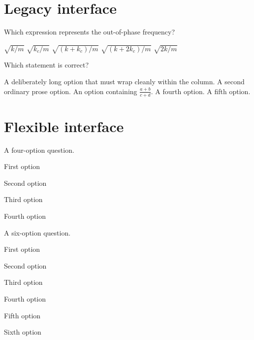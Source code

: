 \documentclass[10pt,a4paper]{physicsquiz}
\begin{document}
\section*{Legacy interface}

\begin{quizquestions}[2]
    \item Which expression represents the out-of-phase frequency?

    \choices
    {\(\sqrt{k/m}\)}
    {\(\sqrt{k_c/m}\)}
    {\(\sqrt{(k+k_c)/m}\)}
    {\(\sqrt{(k+2k_c)/m}\)}
    {\(\sqrt{2k/m}\)}

    \item Which statement is correct?

    \choices
    {A deliberately long option that must wrap cleanly within the column.}
    {A second ordinary prose option.}
    {An option containing \(\displaystyle\frac{a+b}{c+d}\).}
    {A fourth option.}
    {A fifth option.}
\end{quizquestions}

\section*{Flexible interface}

\begin{quizquestions}[2]
    \item A four-option question.

    \begin{choiceoptions}
        \item First option
        \item Second option
        \item Third option
        \item Fourth option
    \end{choiceoptions}

    \item A six-option question.

    \begin{choiceoptions}
        \item First option
        \item Second option
        \item Third option
        \item Fourth option
        \item Fifth option
        \item Sixth option
    \end{choiceoptions}
\end{quizquestions}
\end{document}
